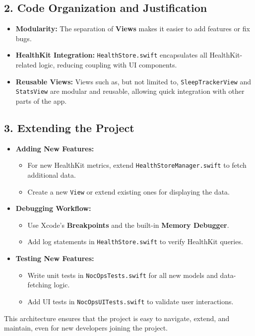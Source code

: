 \documentclass[10pt,twocolumn]{article}
\begin{document}
\subsection*{2. Code Organization and Justification}
\begin{itemize}
    \item \textbf{Modularity:} The separation of \textbf{Views} makes it easier to add features or fix bugs.
    \item \textbf{HealthKit Integration:} \texttt{HealthStore.swift} encapsulates all HealthKit-related logic, reducing coupling with UI components.
    \item \textbf{Reusable Views:} Views such as, but not limited to, \texttt{SleepTrackerView} and \texttt{StatsView} are modular and reusable, allowing quick integration with other parts of the app.
\end{itemize}

\subsection*{3. Extending the Project}
\begin{itemize}
    \item \textbf{Adding New Features:}
    \begin{itemize}
        \item For new HealthKit metrics, extend \texttt{HealthStoreManager.swift} to fetch additional data.
        \item Create a new \texttt{View} or extend existing ones for displaying the data.
    \end{itemize}
    \item \textbf{Debugging Workflow:}
    \begin{itemize}
        \item Use Xcode's \textbf{Breakpoints} and the built-in \textbf{Memory Debugger}.
        \item Add log statements in \texttt{HealthStore.swift} to verify HealthKit queries.
    \end{itemize}
    \item \textbf{Testing New Features:}
    \begin{itemize}
        \item Write unit tests in \texttt{NocOpsTests.swift} for all new models and data-fetching logic.
        \item Add UI tests in \texttt{NocOpsUITests.swift} to validate user interactions.
    \end{itemize}
\end{itemize}

This architecture ensures that the project is easy to navigate, extend, and maintain, even for new developers joining the project.


\printbibliography
\end{document}
